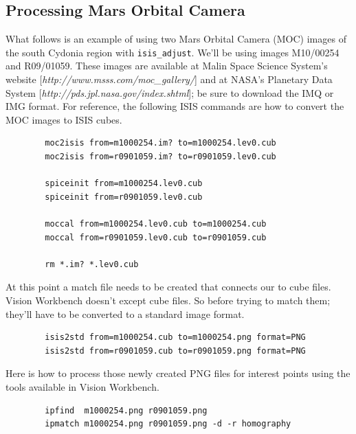 \subsection{Processing Mars Orbital Camera}

What follows is an example of using two Mars Orbital Camera (MOC)
images of the south Cydonia region with \texttt{isis\_adjust}. We'll
be using images M10/00254 and R09/01059. These images are available
at Malin Space Science System's website
[\emph{http://www.msss.com/moc\_gallery/}] and at NASA's Planetary
Data System [\emph{http://pds.jpl.nasa.gov/index.shtml}]; be sure to
download the IMQ or IMG format. For reference, the following ISIS commands
are how to convert the MOC images to ISIS cubes.

\begin{verbatim}
        moc2isis from=m1000254.im? to=m1000254.lev0.cub
        moc2isis from=r0901059.im? to=r0901059.lev0.cub

        spiceinit from=m1000254.lev0.cub
        spiceinit from=r0901059.lev0.cub

        moccal from=m1000254.lev0.cub to=m1000254.cub
        moccal from=r0901059.lev0.cub to=r0901059.cub

        rm *.im? *.lev0.cub
\end{verbatim}

At this point a match file needs to be created that connects our to
cube files. Vision Workbench doesn't except cube files. So before
trying to match them; they'll have to be converted to a standard image
format.

\begin{verbatim}
        isis2std from=m1000254.cub to=m1000254.png format=PNG
        isis2std from=r0901059.cub to=r0901059.png format=PNG
\end{verbatim}

Here is how to process those newly created PNG files for interest
points using the tools available in Vision Workbench.

\begin{verbatim}
        ipfind  m1000254.png r0901059.png
        ipmatch m1000254.png r0901059.png -d -r homography
\end{verbatim}

